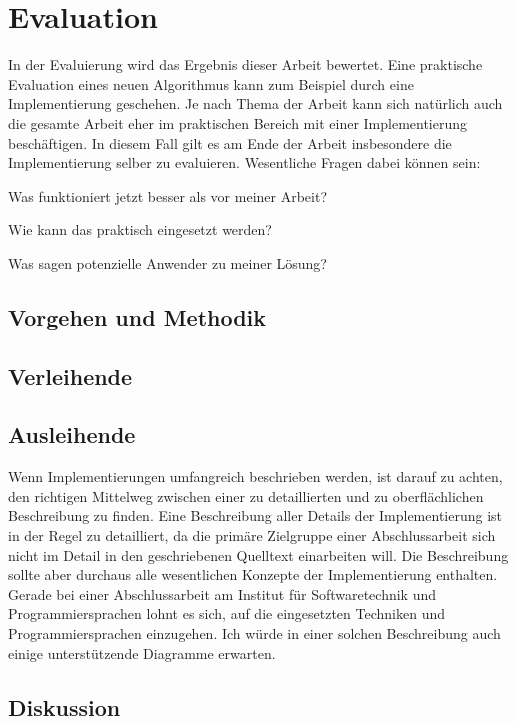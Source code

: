 
\chapter{Evaluation}
\label{chapter-evaluation}

In der Evaluierung wird das Ergebnis dieser Arbeit bewertet. Eine praktische Evaluation eines neuen Algorithmus kann zum Beispiel durch eine Implementierung geschehen. Je nach Thema der Arbeit kann sich natürlich auch die gesamte Arbeit eher im praktischen Bereich mit einer Implementierung beschäftigen. In diesem Fall gilt es am Ende der Arbeit insbesondere die Implementierung selber zu evaluieren. Wesentliche Fragen dabei können sein:
\begin{compactitem}[--]
  \item Was funktioniert jetzt besser als vor meiner Arbeit?
  \item Wie kann das praktisch eingesetzt werden?
  \item Was sagen potenzielle Anwender zu meiner Lösung?
\end{compactitem}

\section{Vorgehen und Methodik}

\section{Verleihende}

\section{Ausleihende}

Wenn Implementierungen umfangreich beschrieben werden, ist darauf zu achten, den richtigen Mittelweg zwischen einer zu detaillierten und zu oberflächlichen Beschreibung zu finden. Eine Beschreibung aller Details der Implementierung ist in der Regel zu detailliert, da die primäre Zielgruppe einer Abschlussarbeit sich nicht im Detail in den geschriebenen Quelltext einarbeiten will. Die Beschreibung sollte aber durchaus alle wesentlichen Konzepte der Implementierung enthalten. Gerade bei einer Abschlussarbeit am Institut für Softwaretechnik und Programmiersprachen lohnt es sich, auf die eingesetzten Techniken und Programmiersprachen einzugehen. Ich würde in einer solchen Beschreibung auch einige unterstützende Diagramme erwarten.


\section{Diskussion}